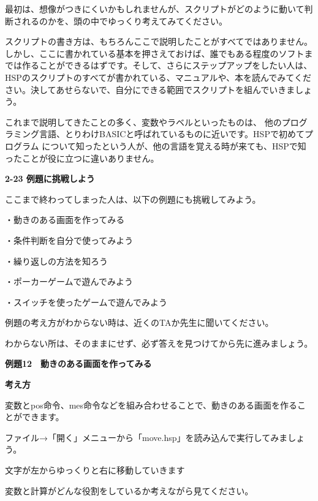 \documentclass[a4paper,dvipdfmx]{jarticle}
\newcommand\textstyleqwerty[1]{#1}
\begin{document}
最初は、想像がつきにくいかもしれませんが、スクリプトがどのように動いて判断されるのかを、頭の中でゆっくり考えてみてください。

スクリプトの書き方は、もちろんここで説明したことがすべてではありません。しかし、ここに書かれている基本を押さえておけば、誰でもある程度のソフトまでは作ることができるはずです。そして、さらにステップアップをしたい人は、HSPのスクリプトのすべてが書かれている、マニュアルや、本を読んでみてください。決してあせらないで、自分にできる範囲でスクリプトを組んでいきましょう。

これまで説明してきたことの多く、変数やラベルといったものは、
他のプログラミング言語、とりわけBASICと呼ばれているものに近いです。HSPで初めてプログラム
について知ったという人が、他の言語を覚える時が来ても、HSPで知ったことが役に立つに違いありません。

{\bfseries
2-23 例題に挑戦しよう}


\bigskip

ここまで終わってしまった人は、以下の例題にも挑戦してみよう。


\bigskip

・動きのある画面を作ってみる

・条件判断を自分で使ってみよう

・繰り返しの方法を知ろう

・ポーカーゲームで遊んでみよう

・スイッチを使ったゲームで遊んでみよう


\bigskip

例題の考え方がわからない時は、近くのTAか先生に聞いてください。

わからない所は、そのままにせず、必ず答えを見つけてから先に進みましょう。


\bigskip


\bigskip

\textstyleqwerty{\textbf{例題12　動きのある画面を作ってみる}}



\bigskip

{\bfseries
考え方}


\bigskip

変数とpos命令、mes命令などを組み合わせることで、動きのある画面を作ることができます。

ファイル→「開く」メニューから「move.hsp」を読み込んで実行してみましょう。

文字が左からゆっくりと右に移動していきます

変数と計算がどんな役割をしているか考えながら見てください。
\end{document}
